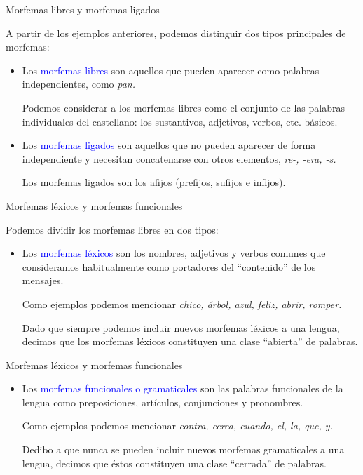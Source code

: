 \documentclass{beamer}
\begin{document}
\begin{frame}{Morfemas libres y morfemas ligados}

A partir de los ejemplos anteriores, podemos distinguir dos tipos principales de morfemas:

\begin{itemize}
	\item Los \textcolor{blue}{morfemas libres} son aquellos que pueden aparecer como palabras independientes, como \it{pan}. 
	
	Podemos considerar a los morfemas libres como el conjunto de las palabras individuales del castellano: los sustantivos, adjetivos, verbos, etc. básicos. 
	\item Los \textcolor{blue}{morfemas ligados} son aquellos que no pueden aparecer de forma independiente y necesitan concatenarse con otros elementos, \it{re-, -era, -s}. 
	
	Los morfemas ligados son los afijos (prefijos, sufijos e infijos).
\end{itemize}

\end{frame}

\begin{frame}{Morfemas léxicos y morfemas funcionales}

Podemos dividir los morfemas libres en dos tipos:	

\begin{itemize}
	\item Los \textcolor{blue}{morfemas léxicos} son los nombres, adjetivos y verbos comunes que consideramos habitualmente como portadores del ``contenido'' de los mensajes.
	
	Como ejemplos podemos mencionar \it{chico, árbol, azul, feliz, abrir, romper}.
	
	Dado que siempre podemos incluir nuevos morfemas léxicos a una lengua, decimos que los morfemas léxicos constituyen una clase ``abierta'' de palabras. 
\end{itemize}
\end{frame}


\begin{frame}{Morfemas léxicos y morfemas funcionales}

\begin{itemize}
	\item Los \textcolor{blue}{morfemas funcionales o gramaticales} son las palabras funcionales de la lengua como preposiciones, artículos, conjunciones y pronombres.
	
	Como ejemplos podemos mencionar \it{contra, cerca, cuando, el, la, que, y}.
	
	Dedibo a que nunca se pueden incluir nuevos morfemas gramaticales a una lengua, decimos que éstos constituyen una clase ``cerrada'' de palabras. 
	
\end{itemize}
\end{frame}
\end{document}
